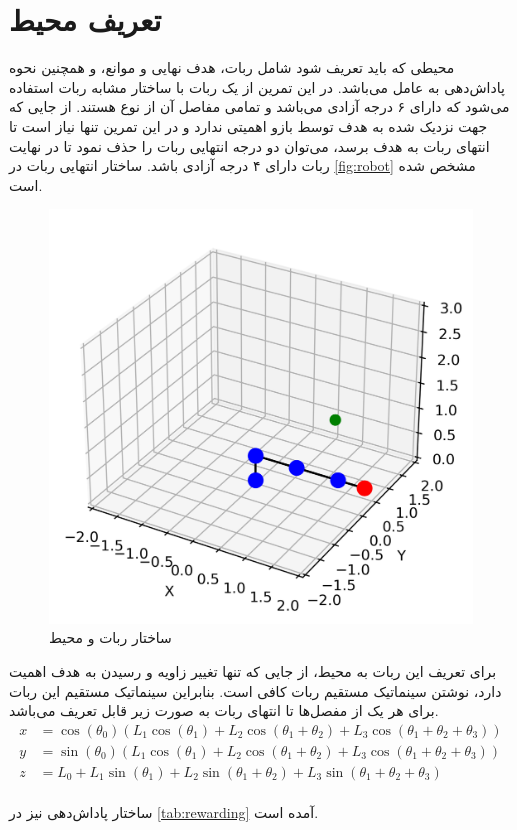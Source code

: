 \documentclass[11pt]{article}
\begin{document}
	\section{تعریف محیط}
	محیطی که باید تعریف شود شامل ربات، هدف نهایی و موانع، و همچنین نحوه پاداش‌دهی به عامل می‌باشد. در این تمرین از یک ربات با ساختار مشابه ربات 
	استفاده می‌شود که دارای ۶ درجه آزادی می‌باشد و تمامی مفاصل آن از نوع 
	هستند. از جایی که جهت نزدیک شده به هدف توسط بازو اهمیتی ندارد و در این تمرین تنها نیاز است تا انتهای ربات به هدف برسد، می‌توان دو درجه انتهایی ربات را حذف نمود تا در نهایت ربات دارای ۴ درجه آزادی باشد. ساختار انتهایی ربات در 
	\autoref{fig:robot}
	مشخص شده است.
	\begin{figure}[!h]
		\centerline{\includegraphics[width=0.5\linewidth]{../robot.png}}
		\caption{ساختار ربات و محیط}
		\label{fig:robot}
	\end{figure}
	برای تعریف این ربات به محیط، از جایی که تنها تغییر زاویه و رسیدن به هدف اهمیت دارد، نوشتن سینماتیک مستقیم ربات کافی است. بنابراین سینماتیک مستقیم این ربات برای هر یک از مفصل‌ها تا انتهای ربات به صورت زیر قابل تعریف می‌باشد.
\begin{equation}
	\begin{aligned}
		x &= \cos(\theta_0) \left( L_1 \cos(\theta_1) + L_2 \cos(\theta_1 + \theta_2) + L_3 \cos(\theta_1 + \theta_2 + \theta_3) \right) \\
		y &= \sin(\theta_0) \left( L_1 \cos(\theta_1) + L_2 \cos(\theta_1 + \theta_2) + L_3 \cos(\theta_1 + \theta_2 + \theta_3) \right) \\
		z &= L_0 + L_1 \sin(\theta_1) + L_2 \sin(\theta_1 + \theta_2) + L_3 \sin(\theta_1 + \theta_2 + \theta_3)
	\end{aligned}
\end{equation}\\
ساختار پاداش‌دهی نیز در 
\autoref{tab:rewarding}
آمده است.
\end{document}
